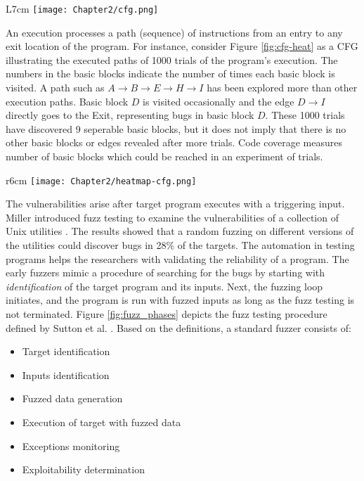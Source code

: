 \begin{wrapfigure}{L}{7cm}
  \texttt{[image: Chapter2/cfg.png]}
  \caption{Control Flow Graph of bubblesort algorithm in Algorithm \ref{algo:bubble}}
  \label{fig:cfg}
\end{wrapfigure}

An execution processes a path (sequence) of instructions from an entry to any exit location of the program. For instance, consider Figure \ref{fig:cfg-heat} as a CFG illustrating the executed paths of 1000 trials of the program's execution. The numbers in the basic blocks indicate the number of times each basic block is visited. A path such as $A \rightarrow B \rightarrow E \rightarrow H \rightarrow I$ has been explored more than other execution paths. Basic block $D$ is visited occasionally and the edge $D \rightarrow I$ directly goes to the Exit, representing bugs in basic block $D$. These 1000 trials have discovered 9 seperable basic blocks, but it does not imply that there is no other basic blocks or edges revealed after more trials. Code coverage measures number of basic blocks which could be reached in an experiment of trials.

\begin{wrapfigure}{r}{6cm}
  \texttt{[image: Chapter2/heatmap-cfg.png]}
  \caption{CFG Heatmap \ref{algo:bubble}}
  \label{fig:cfg-heat}
\end{wrapfigure}

The vulnerabilities arise after target program executes with a triggering input. Miller introduced fuzz testing to examine the vulnerabilities of a collection of Unix utilities \cite{miller1990empirical}. The results showed that a random fuzzing on different versions of the utilities could discover bugs in 28\% of the targets. The automation in testing programs helps the researchers with validating the reliability of a program. The early fuzzers mimic a procedure of searching for the bugs by starting with \textit{identification} of the target program and its inputs. Next, the fuzzing loop initiates, and the program is run with fuzzed inputs as long as the fuzz testing is not terminated. Figure \ref{fig:fuzz_phases} depicts the fuzz testing procedure defined by Sutton et al. \cite{sutton2007fuzzing}. Based on the definitions, a standard fuzzer consists of:

\begin{itemize}
    \item Target identification
    \item Inputs identification
    \item Fuzzed data generation
    \item Execution of target with fuzzed data
    \item Exceptions monitoring
    \item Exploitability determination
\end{itemize}

